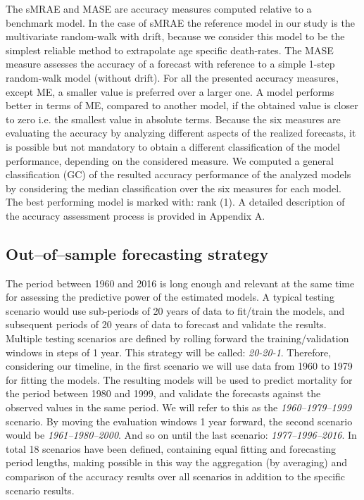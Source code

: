 \documentclass[T0_MEM]{subfiles}
\begin{document}
The sMRAE and MASE are accuracy measures computed relative to a benchmark model. In the case of sMRAE the reference model in our study is the multivariate random-walk with drift, because we consider this model to be the simplest reliable method to extrapolate age specific death-rates. The MASE measure assesses the accuracy of a forecast with reference to a simple 1-step random-walk model (without drift). For all the presented accuracy measures, except ME, a smaller value is preferred over a larger one. A model performs better in terms of ME, compared to another model, if the obtained value is closer to zero i.e. the smallest value in absolute terms. Because the six measures are evaluating the accuracy by analyzing different aspects of the realized forecasts, it is possible but not mandatory to obtain a different classification of the model performance, depending on the considered measure. We computed a general classification (GC) of the resulted accuracy performance of the analyzed models by considering the median classification over the six measures for each model. The best performing model is marked with: rank (1). A detailed description of the accuracy assessment process is provided in Appendix A.

\subsection{Out--of--sample forecasting strategy}\label{sec:fc_strategy}

The period between 1960 and 2016 is long enough and relevant at the same time for assessing the predictive power of the estimated models. A typical testing scenario would use sub-periods of 20 years of data to fit/train the models, and subsequent periods of 20 years of data to forecast and validate the results. Multiple testing scenarios are defined by rolling forward the training/validation windows in steps of 1 year. This strategy will be called: \emph{20-20-1}. Therefore, considering our timeline, in the first scenario we will use data from 1960 to 1979 for fitting the models. The resulting models will be used to predict mortality for the period between 1980 and 1999, and validate the forecasts against the observed values in the same period. We will refer to this as the \emph{1960--1979--1999} scenario. By moving the evaluation windows 1 year forward, the second scenario would be \emph{1961--1980--2000}. And so on until the last scenario: \emph{1977--1996--2016}. In total 18 scenarios have been defined, containing equal fitting and forecasting period lengths, making possible in this way the aggregation (by averaging) and comparison of the accuracy results over all scenarios in addition to the specific scenario results.
\end{document}
